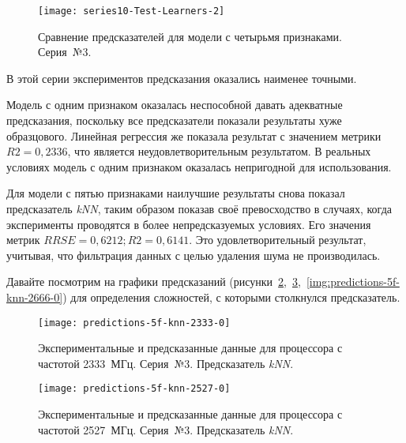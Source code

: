 \begin{figure}[H]
    \begin{center}
        \texttt{[image: series10-Test-Learners-2]}
        \caption{Сравнение предсказателей для модели с четырьмя признаками. Серия~№3.}
        \label{img:series10-Test-Learners-2}
    \end{center}
\end{figure}

В этой серии экспериментов предсказания оказались наименее точными.

Модель с одним признаком оказалась неспособной давать адекватные предсказания, поскольку все предсказатели показали результаты хуже образцового. Линейная регрессия же показала результат с значением метрики $R2 = 0,2336$, что является неудовлетворительным результатом. В реальных условиях модель с одним признаком оказалась непригодной для использования.

Для модели с пятью признаками наилучшие результаты снова показал предсказатель \textit{kNN}, таким образом показав своё превосходство в случаях, когда эксперименты проводятся в более непредсказуемых условиях. Его значения метрик $RRSE = 0,6212; R2 = 0,6141$. Это удовлетворительный результат, учитывая, что фильтрация данных с целью удаления шума не производилась.

Давайте посмотрим на графики предсказаний (рисунки~\ref{img:predictions-5f-knn-2333-0},~\ref{img:predictions-5f-knn-2527-0},~\ref{img:predictions-5f-knn-2666-0}) для определения сложностей, с которыми столкнулся предсказатель.

\begin{figure}[H]
    \begin{center}
        \texttt{[image: predictions-5f-knn-2333-0]}
        \caption{Экспериментальные и предсказанные данные для процессора с частотой 2333~МГц. Серия~№3. Предсказатель \textit{kNN}.}
        \label{img:predictions-5f-knn-2333-0}
    \end{center}
\end{figure}

\begin{figure}[H]
    \begin{center}
        \texttt{[image: predictions-5f-knn-2527-0]}
        \caption{Экспериментальные и предсказанные данные для процессора с частотой 2527~МГц. Серия~№3. Предсказатель \textit{kNN}.}
        \label{img:predictions-5f-knn-2527-0}
    \end{center}
\end{figure}

